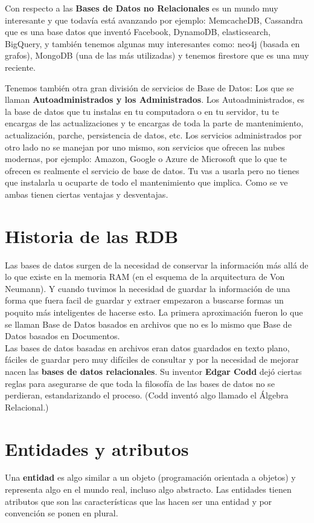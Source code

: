 \documentclass{article}
\begin{document}
Con respecto a las \textbf{Bases de Datos no Relacionales} es un mundo muy
interesante y que todavía está avanzando por ejemplo: MemcacheDB, Cassandra que
es una base datos que inventó Facebook, DynamoDB, elasticsearch, BigQuery, y
también tenemos algunas muy interesantes como: neo4j (basada en grafos),
MongoDB (una de las más utilizadas) y tenemos firestore que es una muy
reciente.

Tenemos también otra gran división de servicios de Base de Datos: Los que se
llaman \textbf{Autoadministrados y los Administrados}. Los Autoadministrados,
es la base de datos que tu instalas en tu computadora o en tu servidor, tu te
encargas de las actualizaciones y te encargas de toda la parte de
mantenimiento, actualización, parche, persistencia de datos, etc. Los servicios
administrados por otro lado no se manejan por uno mismo, son servicios que
ofrecen las nubes modernas, por ejemplo: Amazon, Google o Azure de Microsoft
que lo que te ofrecen es realmente el servicio de base de datos. Tu vas a
usarla pero no tienes que instalarla u ocuparte de todo el mantenimiento que
implica. Como se ve ambas tienen ciertas ventajas y desventajas.

\section{Historia de las RDB}%
Las bases de datos surgen de la necesidad de conservar la información más allá
de lo que existe en la memoria RAM (en el esquema de la arquitectura de Von
Neumann). Y cuando tuvimos la necesidad de guardar la información de una forma
que fuera facil de guardar y extraer empezaron a buscarse formas un poquito más
inteligentes de hacerse esto. La primera aproximación fueron lo que se llaman
Base de Datos basados en archivos que no es lo mismo que Base de Datos basados
en Documentos.\\

Las bases de datos basadas en archivos eran datos guardados en texto plano,
fáciles de guardar pero muy difíciles de consultar y por la necesidad de
mejorar nacen las \textbf{bases de datos relacionales}. Su inventor
\textbf{Edgar Codd} dejó ciertas reglas para asegurarse de que toda la
filosofía de las bases de datos no se perdieran, estandarizando el proceso.
(Codd inventó algo llamado el Álgebra Relacional.)\\

\section{Entidades y atributos}%
Una \textbf{entidad} es algo similar a un objeto (programación orientada a
objetos) y representa algo en el mundo real, incluso algo abstracto. Las
entidades tienen atributos que son las características que las hacen ser una
entidad y por convención se ponen en plural.
\end{document}
